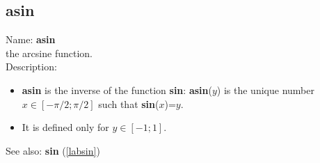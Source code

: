 \subsection{asin}
\label{labasin}
\noindent Name: \textbf{asin}\\
the arcsine function.\\
\noindent Description: \begin{itemize}

\item \textbf{asin} is the inverse of the function \textbf{sin}: \textbf{asin}($y$) is the unique number 
   $x \in [-\pi/2; \pi/2]$ such that \textbf{sin}($x$)=$y$.

\item It is defined only for $y \in [-1;1]$.
\end{itemize}
See also: \textbf{sin} (\ref{labsin})
